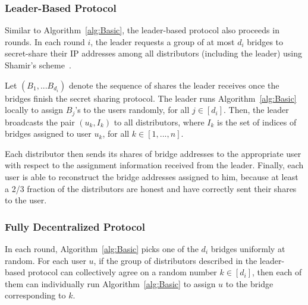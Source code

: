 \documentclass{sig-alternate-05-2015}
\newcommand{\algFont}{\fontsize{10}{13}\selectfont}
\newcommand{\bricks}{}
\def\bricks/{\mbox{TorBricks}}
\begin{document}
\subsubsection{Leader-Based Protocol} \label{sec:leader-alg}

Similar to Algorithm~\ref{alg:Basic}, the leader-based protocol also proceeds in rounds. In each round $i$, the leader requests a group of at most $d_i$ bridges to secret-share their IP addresses among all distributors (including the leader) using Shamir's scheme~\cite{shamir:how}. 

Let $(B_1,...B_{d_i})$ denote the sequence of shares the leader receives once the bridges finish the secret sharing protocol. The leader runs Algorithm~\ref{alg:Basic} locally to assign $B_j$'s to the users randomly, for all ${j \in [d_i]}$. Then, the leader broadcasts the pair $(u_k, I_k)$ to all distributors, where $I_k$ is the set of indices of bridges assigned to user $u_k$, for all $k \in [1,...,n]$.

Each distributor then sends its shares of bridge addresses to the appropriate user with respect to the assignment information received from the leader. Finally, each user is able to reconstruct the bridge addresses assigned to him, because at least a 2/3 fraction of the distributors are honest and have correctly sent their shares to the user.
%	

\subsubsection{Fully Decentralized Protocol} \label{sec:decentralized-alg}
In each round, Algorithm~\ref{alg:Basic} picks one of the $d_i$ bridges uniformly at random. For each user $u$, if the group of distributors described in the leader-based protocol can collectively agree on a random number ${k \in [d_i]}$, then each of them can individually run Algorithm~\ref{alg:Basic} to assign $u$ to the bridge corresponding to $k$. 
\end{document}
